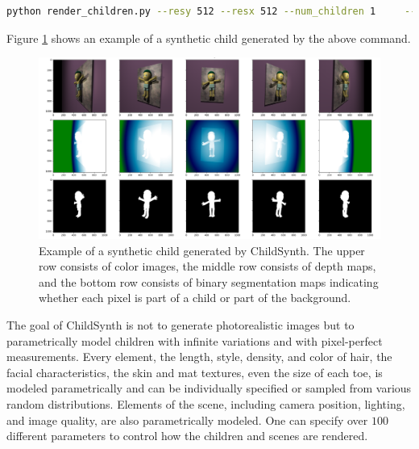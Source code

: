 \documentclass{article}
\begin{document}
\begin{lstlisting}[language=bash]
python render_children.py --resy 512 --resx 512 --num_children 1     --output_dir ./output 
\end{lstlisting}

Figure \ref{fig:child_0} shows an example of a synthetic child generated by the above command.

\begin{figure}[]
    \centering
    \includegraphics[width=\textwidth]{plots/child_0.png}
    \caption{Example of a synthetic child generated by ChildSynth. The upper row consists of color images, the middle row consists of depth maps, and the bottom row consists of binary segmentation maps indicating whether each pixel is part of a child or part of the background.}
    \label{fig:child_0}
\end{figure}

The goal of ChildSynth is not to generate photorealistic images but to parametrically model children with infinite variations and with pixel-perfect measurements. Every element, the length, style, density, and color of hair, the facial characteristics, the skin and mat textures, even the size of each toe, is modeled parametrically and can be individually specified or sampled from various random distributions. Elements of the scene, including camera position, lighting, and image quality, are also parametrically modeled. One can specify over $100$ different parameters to control how the children and scenes are rendered. 
\end{document}
